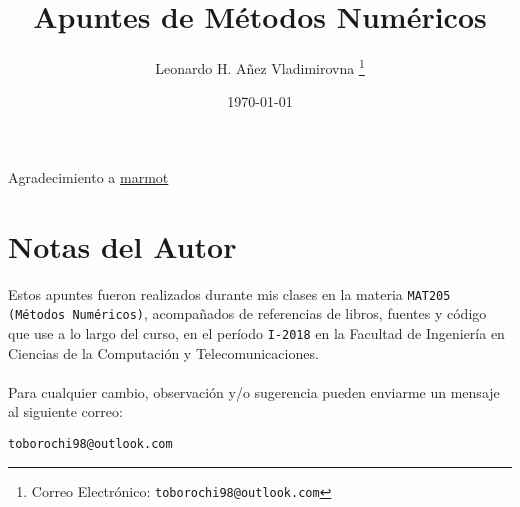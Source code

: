 

\title{Apuntes de Métodos Numéricos}

\author{Leonardo H. Añez Vladimirovna%
  \thanks{Correo Electrónico: \texttt{toborochi98@outlook.com}}}
\date{\today}

\maketitle

Agradecimiento a \href{https://tex.stackexchange.com/users/121799/marmot}{marmot}

\section*{Notas del Autor}
Estos apuntes fueron realizados durante mis clases en la materia \texttt{MAT205 (Métodos Numéricos)}, acompañados de referencias de libros, fuentes y código que use a lo largo del curso, en el período \texttt{I-2018} en la Facultad de Ingeniería en Ciencias de la Computación y Telecomunicaciones. 
\\ \vspace{0.5cm} \\
Para cualquier cambio, observación y/o sugerencia pueden enviarme un mensaje al siguiente correo:
\begin{center}
 \texttt{toborochi98@outlook.com}
\end{center}

\tableofcontents
